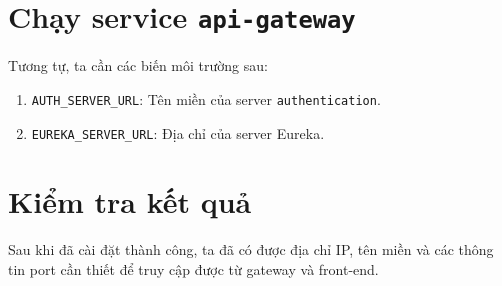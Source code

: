 \section{Chạy service \texttt{api-gateway}}
Tương tự, ta cần các biến môi trường sau:
\begin{enumerate}
    \item \texttt{AUTH\_SERVER\_URL}: Tên miền của server \texttt{authentication}.
    \item \texttt{EUREKA\_SERVER\_URL}: Địa chỉ của server Eureka.
\end{enumerate}

\section{Kiểm tra kết quả}
Sau khi đã cài đặt thành công, ta đã có được địa chỉ IP, tên miền và các thông tin port cần thiết để truy cập được từ gateway và front-end.




